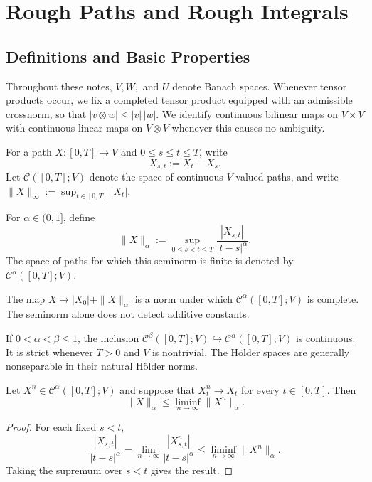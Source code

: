 \chapter{Rough Paths and Rough Integrals}

\section{Definitions and Basic Properties}

Throughout these notes, $V,W,$ and $U$ denote Banach spaces.  Whenever tensor
products occur, we fix a completed tensor product equipped with an admissible
crossnorm, so that $|v\otimes w|\le |v|\,|w|$.  We identify continuous bilinear
maps on $V\times V$ with continuous linear maps on $V\otimes V$ whenever this
causes no ambiguity.

For a path $X\colon[0,T]\to V$ and $0\le s\le t\le T$, write
\[
  X_{s,t}:=X_t-X_s.
\]
Let $\mathcal C([0,T];V)$ denote the space of continuous $V$-valued paths, and
write $\|X\|_\infty:=\sup_{t\in[0,T]}|X_t|$.

\begin{de}
For $\alpha\in(0,1]$, define
\[
  \|X\|_\alpha:=\sup_{0\le s<t\le T}
  \frac{|X_{s,t}|}{|t-s|^\alpha}.
\]
The space of paths for which this seminorm is finite is denoted by
$\mathcal C^\alpha([0,T];V)$.
\end{de}

\begin{remark}
The map $X\mapsto |X_0|+\|X\|_\alpha$ is a norm under which
$\mathcal C^\alpha([0,T];V)$ is complete.  The seminorm alone does not detect
additive constants.
\end{remark}

If $0<\alpha<\beta\le1$, the inclusion
$\mathcal C^\beta([0,T];V)\hookrightarrow\mathcal C^\alpha([0,T];V)$
is continuous.  It is strict whenever $T>0$ and $V$ is nontrivial.  The Hölder
spaces are generally nonseparable in their natural Hölder norms.

\begin{lem}
Let $X^n\in\mathcal C^\alpha([0,T];V)$ and suppose that $X^n_t\to X_t$ for every
$t\in[0,T]$.  Then
\[
  \|X\|_\alpha\le \liminf_{n\to\infty}\|X^n\|_\alpha.
\]
\end{lem}

\begin{proof}
For each fixed $s<t$,
\[
  \frac{|X_{s,t}|}{|t-s|^\alpha}
  =\lim_{n\to\infty}\frac{|X^n_{s,t}|}{|t-s|^\alpha}
  \le \liminf_{n\to\infty}\|X^n\|_\alpha.
\]
Taking the supremum over $s<t$ gives the result.
\end{proof}

